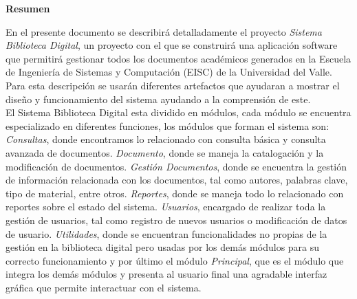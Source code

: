 %
%

\begin{center}
        \textbf{Resumen}
\end{center}

En el presente documento se describirá detalladamente el proyecto \textit{Sistema Biblioteca Digital}, un proyecto con el que se construirá una aplicación software que permitirá gestionar todos los documentos académicos generados en la Escuela de Ingeniería de Sistemas y Computación (EISC) de la Universidad del Valle. Para esta descripción se usarán diferentes artefactos que ayudaran a mostrar el  diseño y funcionamiento del sistema ayudando a la comprensión de este.\\

El Sistema Biblioteca Digital esta dividido en módulos, cada módulo se encuentra especializado en diferentes funciones, los módulos que forman el sistema son: \textit{Consultas}, donde encontramos lo relacionado con consulta básica y consulta avanzada de documentos. \textit{Documento}, donde se maneja la catalogación y la modificación de documentos. \textit{Gestión Documentos}, donde se encuentra la gestión de información relacionada con los documentos, tal como autores, palabras clave, tipo de material, entre otros. \textit{Reportes}, donde se maneja todo lo relacionado con reportes sobre el estado del sistema. \textit{Usuarios}, encargado de realizar toda la gestión de usuarios, tal como registro de nuevos usuarios o modificación de datos de usuario. \textit{Utilidades}, donde se encuentran funcionalidades no propias de la gestión en la biblioteca digital pero usadas por los demás módulos para su correcto funcionamiento y por último el módulo \textit{Principal}, que es el módulo que integra los demás módulos y presenta al usuario final una agradable interfaz gráfica que permite interactuar con el sistema.

%